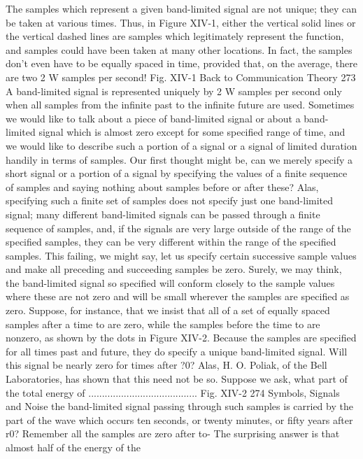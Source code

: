 {{{{{{{{{{{{The samples which represent a given band-limited signal are not
unique; they can be taken at various times. Thus, in Figure XIV-1,
either the vertical solid lines or the vertical dashed lines are samples
which legitimately represent the function, and samples could have
been taken at many other locations. In fact, the samples don’t
even have to be equally spaced in time, provided that, on the
average, there are two 2 W samples per second!
Fig. XIV-1
Back to Communication Theory
273
A band-limited signal is represented uniquely by 2 W samples
per second only when all samples from the infinite past to the
infinite future are used. Sometimes we would like to talk about a
piece of band-limited signal or about a band-limited signal which
is almost zero except for some specified range of time, and we
would like to describe such a portion of a signal or a signal of
limited duration handily in terms of samples.
Our first thought might be, can we merely specify a short signal
or a portion of a signal by specifying the values of a finite sequence
of samples and saying nothing about samples before or after these?
Alas, specifying such a finite set of samples does not specify just
one band-limited signal; many different band-limited signals can
be passed through a finite sequence of samples, and, if the signals
are very large outside of the range of the specified samples, they
can be very different within the range of the specified samples.
This failing, we might say, let us specify certain successive
sample values and make all preceding and succeeding samples be
zero. Surely, we may think, the band-limited signal so specified
will conform closely to the sample values where these are not zero
and will be small wherever the samples are specified as zero.
Suppose, for instance, that we insist that all of a set of equally
spaced samples after a time to are zero, while the samples before
the time to are nonzero, as shown by the dots in Figure XIV-2.
Because the samples are specified for all times past and future, they
do specify a unique band-limited signal. Will this signal be nearly
zero for times after ?0?
Alas, H. O. Poliak, of the Bell Laboratories, has shown that this
need not be so. Suppose we ask, what part of the total energy of
........................................
Fig. XIV-2
274
Symbols,
Signals and Noise
the band-limited signal passing through such samples is carried
by the part of the wave which occurs ten seconds, or twenty
minutes, or fifty years after r0? Remember all the samples are zero
after to-
The surprising answer is that almost half of the energy of the
}}}}}}}}}}}}
